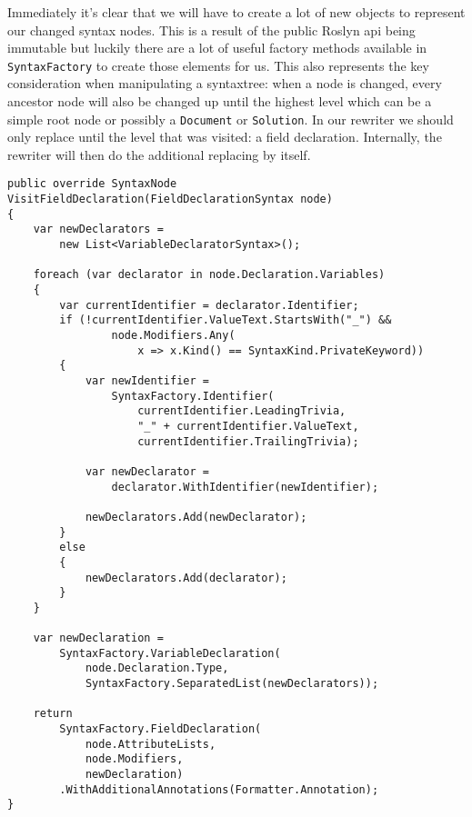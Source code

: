 Immediately it's clear that we will have to create a lot of new objects to represent our changed syntax nodes. This is a result of the public Roslyn \gls{api} being \gls{immutable} but luckily there are a lot of useful factory methods available in \texttt{SyntaxFactory} to create those elements for us. This also represents the key consideration when manipulating a \gls{syntaxtree}: when a node is changed, every ancestor node will also be changed up until the highest level which can be a simple root node or possibly a \texttt{Document} or \texttt{Solution}. In our rewriter we should only replace until the level that was visited: a field declaration. Internally, the rewriter will then do the additional replacing by itself.

\clearpage

\begin{lstlisting}[label={lst:syntaxrewriter-implementing-syntaxrewriter}]
public override SyntaxNode VisitFieldDeclaration(FieldDeclarationSyntax node)
{
	var newDeclarators = 
		new List<VariableDeclaratorSyntax>();

	foreach (var declarator in node.Declaration.Variables)
	{
		var currentIdentifier = declarator.Identifier;
		if (!currentIdentifier.ValueText.StartsWith("_") && 
				node.Modifiers.Any(
					x => x.Kind() == SyntaxKind.PrivateKeyword))
		{
			var newIdentifier = 
				SyntaxFactory.Identifier(
					currentIdentifier.LeadingTrivia, 
					"_" + currentIdentifier.ValueText, 
					currentIdentifier.TrailingTrivia);
					
			var newDeclarator = 
				declarator.WithIdentifier(newIdentifier);
				
			newDeclarators.Add(newDeclarator);
		}
		else
		{
			newDeclarators.Add(declarator);
		}
	}
	
	var newDeclaration = 
		SyntaxFactory.VariableDeclaration(
			node.Declaration.Type, 
			SyntaxFactory.SeparatedList(newDeclarators));
			
	return 
		SyntaxFactory.FieldDeclaration(
			node.AttributeLists, 
			node.Modifiers, 
			newDeclaration)
		.WithAdditionalAnnotations(Formatter.Annotation);
}
\end{lstlisting}

